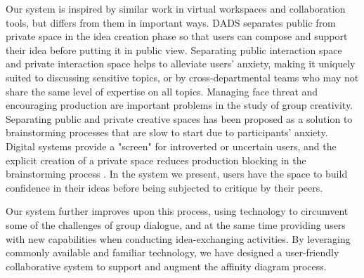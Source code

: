 \documentclass{sigchi}
\begin{document}
Our system is inspired by similar work in virtual workspaces and collaboration tools, but differs from them in important ways. DADS separates public from private space in the idea creation phase so that users can compose and support their idea before putting it in public view. Separating public interaction space and private interaction space helps to alleviate users' anxiety, making it uniquely suited to discussing sensitive topics, or by cross-departmental teams who may not share the same level of expertise on all topics. Managing face threat and encouraging production are important problems in the study of group creativity. Separating public and private creative spaces has been proposed as a solution to brainstorming processes that are slow to start due to participants' anxiety\cite{paulus2000idea}. Digital systems provide a "screen" for introverted or uncertain users, and the explicit creation of a private space reduces production blocking in the brainstorming process \cite{brown1996simple}. In the system we present, users have the space to build confidence in their ideas before being subjected to critique by their peers.

Our system further improves upon this process, using technology to circumvent some of the challenges of group dialogue, and at the same time providing users with new capabilities when conducting idea-exchanging activities. By leveraging commonly available and familiar technology, we have designed a user-friendly collaborative system to support and augment the affinity diagram process.
\end{document}
